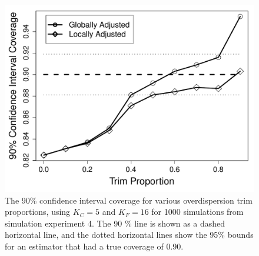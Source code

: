 \documentclass[12pt, titlepage]{article}\usepackage[]{graphicx}\usepackage[]{color}
\makeatletter
\def\maxwidth{ %
  \ifdim\Gin@nat@width>\linewidth
    \linewidth
  \else
    \Gin@nat@width
  \fi
}
\makeatother
\begin{document}
	\begin{figure}[H]
	\begin{center}
	\includegraphics[width = .8\maxwidth]{EffectTrimProp}
	\end{center}
	\caption{The 90\% confidence interval coverage for various overdispersion trim proportions, using $K_C=5$ and $K_F=16$ for 1000 simulations from simulation experiment 4.  The 90 \% line is shown as a dashed horizontal line, and the dotted horizontal lines show the 95\% bounds for an estimator that had a true coverage of 0.90.  \label{EffectTrimProp}}
	\end{figure}

\end{document}
